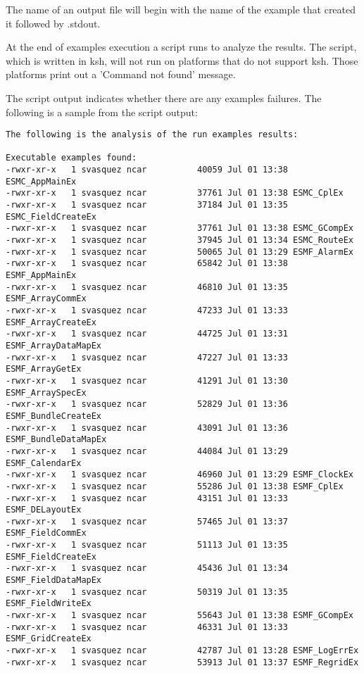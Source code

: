 The name of an output file will begin with the name of the example
that created it followed by .stdout.

At the end of examples execution a script runs to analyze the results.
The script, which is written in ksh, will not run on platforms that do not support
ksh. Those platforms print out a 'Command not found' message.

The script output indicates whether there are any examples failures.
The following is a sample from the script output:

\begin{verbatim}
The following is the analysis of the run examples results:

Executable examples found:
-rwxr-xr-x   1 svasquez ncar          40059 Jul 01 13:38 ESMC_AppMainEx
-rwxr-xr-x   1 svasquez ncar          37761 Jul 01 13:38 ESMC_CplEx
-rwxr-xr-x   1 svasquez ncar          37184 Jul 01 13:35 ESMC_FieldCreateEx
-rwxr-xr-x   1 svasquez ncar          37761 Jul 01 13:38 ESMC_GCompEx
-rwxr-xr-x   1 svasquez ncar          37945 Jul 01 13:34 ESMC_RouteEx
-rwxr-xr-x   1 svasquez ncar          50065 Jul 01 13:29 ESMF_AlarmEx
-rwxr-xr-x   1 svasquez ncar          65842 Jul 01 13:38 ESMF_AppMainEx
-rwxr-xr-x   1 svasquez ncar          46810 Jul 01 13:35 ESMF_ArrayCommEx
-rwxr-xr-x   1 svasquez ncar          47233 Jul 01 13:33 ESMF_ArrayCreateEx
-rwxr-xr-x   1 svasquez ncar          44725 Jul 01 13:31 ESMF_ArrayDataMapEx
-rwxr-xr-x   1 svasquez ncar          47227 Jul 01 13:33 ESMF_ArrayGetEx
-rwxr-xr-x   1 svasquez ncar          41291 Jul 01 13:30 ESMF_ArraySpecEx
-rwxr-xr-x   1 svasquez ncar          52829 Jul 01 13:36 ESMF_BundleCreateEx
-rwxr-xr-x   1 svasquez ncar          43091 Jul 01 13:36 ESMF_BundleDataMapEx
-rwxr-xr-x   1 svasquez ncar          44084 Jul 01 13:29 ESMF_CalendarEx
-rwxr-xr-x   1 svasquez ncar          46960 Jul 01 13:29 ESMF_ClockEx
-rwxr-xr-x   1 svasquez ncar          55286 Jul 01 13:38 ESMF_CplEx
-rwxr-xr-x   1 svasquez ncar          43151 Jul 01 13:33 ESMF_DELayoutEx
-rwxr-xr-x   1 svasquez ncar          57465 Jul 01 13:37 ESMF_FieldCommEx
-rwxr-xr-x   1 svasquez ncar          51113 Jul 01 13:35 ESMF_FieldCreateEx
-rwxr-xr-x   1 svasquez ncar          45436 Jul 01 13:34 ESMF_FieldDataMapEx
-rwxr-xr-x   1 svasquez ncar          50319 Jul 01 13:35 ESMF_FieldWriteEx
-rwxr-xr-x   1 svasquez ncar          55643 Jul 01 13:38 ESMF_GCompEx
-rwxr-xr-x   1 svasquez ncar          46331 Jul 01 13:33 ESMF_GridCreateEx
-rwxr-xr-x   1 svasquez ncar          42787 Jul 01 13:28 ESMF_LogErrEx
-rwxr-xr-x   1 svasquez ncar          53913 Jul 01 13:37 ESMF_RegridEx

\end{verbatim}
